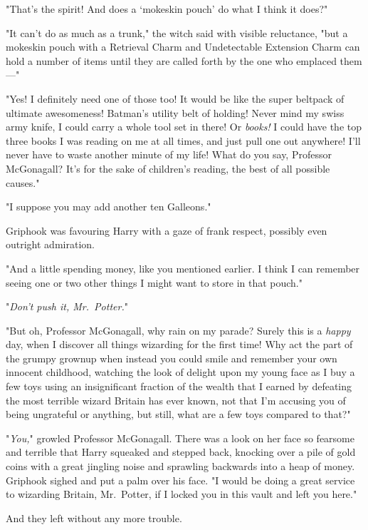 "That's the spirit! And does a `mokeskin pouch' do what I think it does?"

"It can't do as much as a trunk," the witch said with visible reluctance,
"but{\el} a mokeskin pouch with a Retrieval Charm and Undetectable Extension
Charm can hold a number of items until they are called forth by the one who
emplaced them---"

"Yes! I definitely need one of those too! It would be like the super beltpack
of ultimate awesomeness! Batman's utility belt of holding! Never mind my swiss
army knife, I could carry a whole tool set in there! Or \emph{books!} I could
have the top three books I was reading on me at all times, and just pull one
out anywhere! I'll never have to waste another minute of my life! What do you
say, Professor McGonagall? It's for the sake of children's reading, the best of
all possible causes."

"{\el}I suppose you may add another ten Galleons."

Griphook was favouring Harry with a gaze of frank respect, possibly even
outright admiration.

"And a little spending money, like you mentioned earlier. I think I can
remember seeing one or two other things I might want to store in that pouch."

"\emph{Don't push it, Mr.~Potter.}"

"But oh, Professor McGonagall, why rain on my parade? Surely this is a
\emph{happy} day, when I discover all things wizarding for the first time! Why
act the part of the grumpy grownup when instead you could smile and remember
your own innocent childhood, watching the look of delight upon my young face as
I buy a few toys using an insignificant fraction of the wealth that I earned by
defeating the most terrible wizard Britain has ever known, not that I'm
accusing you of being ungrateful or anything, but still, what are a few toys
compared to that?"

"\emph{You,}" growled Professor McGonagall. There was a look on her face so
fearsome and terrible that Harry squeaked and stepped back, knocking over a
pile of gold coins with a great jingling noise and sprawling backwards into a
heap of money. Griphook sighed and put a palm over his face. "I would be doing
a great service to wizarding Britain, Mr.~Potter, if I locked you in this vault
and left you here."

And they left without any more trouble.
